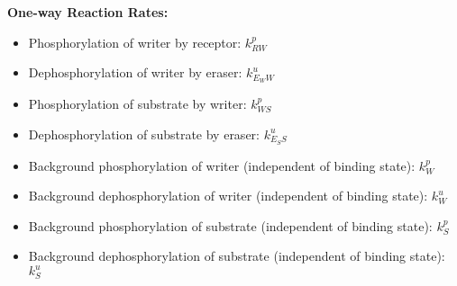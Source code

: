 \documentclass[aps,onecolumn,superscriptaddress,notitlepage]{revtex4-1}
\begin{document}
\textbf{One-way Reaction Rates:}
\begin{itemize}
\item Phosphorylation of writer by receptor: $k_{RW}^p$
\item Dephosphorylation of writer by eraser: $k_{E_WW}^u$
\item Phosphorylation of substrate by writer: $k_{WS}^p$
\item Dephosphorylation of substrate by eraser: $k_{E_SS}^u$
\item Background phosphorylation of writer (independent of binding state): $k_W^p$
\item Background dephosphorylation of writer (independent of binding state): $k_W^u$
\item Background phosphorylation of substrate (independent of binding state): $k_S^p$
\item Background dephosphorylation of substrate (independent of binding state): $k_S^u$
\end{itemize}
\end{document}
